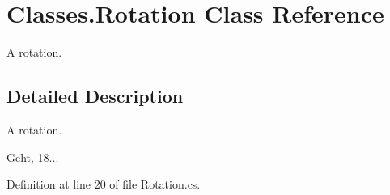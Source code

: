 \section{Classes.\-Rotation Class Reference}
\label{class_classes_1_1_rotation}


A rotation.  




\subsection{Detailed Description}
A rotation. 

Geht, 18... 

Definition at line 20 of file Rotation.\-cs.

